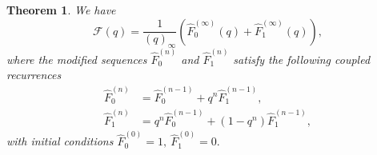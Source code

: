 \documentclass[letterpaper,12pt]{article}
\newtheorem{theorem}{Theorem}
\begin{document}
\begin{theorem}\label{thm:euler-factorization} We have 
\begin{equation}
    \mathcal{F}(q)
= \frac{1}{(q)_\infty}
\left(
\widehat{F}_0^{(\infty)}(q) + \widehat{F}_1^{(\infty)}(q)
\right), 
\end{equation}
where the modified sequences $\widehat{F}_0^{(n)}$ and $\widehat{F}_1^{(n)}$ satisfy the following coupled recurrences  
\begin{align}
\widehat{F}_0^{(n)} &= \widehat{F}_0^{(n-1)} + q^n\widehat{F}_1^{(n-1)},\label{eq:FirstRec}\\
\widehat{F}_1^{(n)} &= q^n \widehat{F}_0^{(n-1)} + (1-q^n)\widehat{F}_1^{(n-1)},\label{eq:SecondRec}
\end{align}
with initial conditions \(\widehat{F}_0^{(0)}=1,\ \widehat{F}_1^{(0)}=0.\)
\end{theorem}
\end{document}
